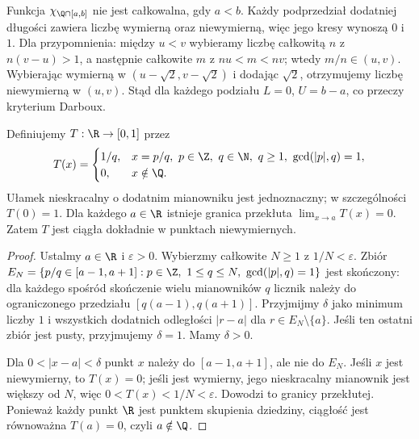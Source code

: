 \begin{przyklad}
\label{ma1:ex:riemann-dirichlet}
Funkcja $\chi_{\Q\cap[a,b]}$ nie jest całkowalna, gdy $a<b$. Każdy podprzedział dodatniej długości zawiera liczbę wymierną oraz niewymierną, więc jego kresy wynoszą $0$ i $1$. Dla przypomnienia: między $u<v$ wybieramy liczbę całkowitą $n$ z $n(v-u)>1$, a następnie całkowite $m$ z $nu<m<nv$; wtedy $m/n\in(u,v)$. Wybierając wymierną w $(u-\sqrt2,v-\sqrt2)$ i dodając $\sqrt2$, otrzymujemy liczbę niewymierną w $(u,v)$. Stąd dla każdego podziału $L=0$, $U=b-a$, co przeczy kryterium Darboux. 
\end{przyklad}

\begin{przyklad}
\label{ma1:ex:thomae}
Definiujemy $T:\R\to[0,1]$ przez
\[
 T(x)=
 \begin{cases}
 1/q,& x=p/q,\ p\in\Z,\ q\in\N,\ q\ge1,\ \gcd(|p|,q)=1,\\
 0,&x\notin\Q.
 \end{cases}
\]
Ułamek nieskracalny o dodatnim mianowniku jest jednoznaczny; w szczególności $T(0)=1$. Dla każdego $a\in\R$ istnieje granica przekłuta $\lim_{x\to a}T(x)=0$. Zatem $T$ jest ciągła dokładnie w punktach niewymiernych.
\end{przyklad}
\begin{proof}
Ustalmy $a\in\R$ i $\varepsilon>0$. Wybierzmy całkowite $N\ge1$ z $1/N<\varepsilon$. Zbiór
$E_N=\{p/q\in[a-1,a+1]:p\in\Z,\ 1\le q\le N,\ \gcd(|p|,q)=1\}$
jest skończony: dla każdego spośród skończenie wielu mianowników $q$ licznik należy do ograniczonego przedziału $[q(a-1),q(a+1)]$. Przyjmijmy $\delta$ jako minimum liczby $1$ i wszystkich dodatnich odległości $|r-a|$ dla $r\in E_N\setminus\{a\}$. Jeśli ten ostatni zbiór jest pusty, przyjmujemy $\delta=1$. Mamy $\delta>0$.

Dla $0<|x-a|<\delta$ punkt $x$ należy do $[a-1,a+1]$, ale nie do $E_N$. Jeśli $x$ jest niewymierny, to $T(x)=0$; jeśli jest wymierny, jego nieskracalny mianownik jest większy od $N$, więc $0<T(x)<1/N<\varepsilon$. Dowodzi to granicy przekłutej. Ponieważ każdy punkt $\R$ jest punktem skupienia dziedziny, ciągłość jest równoważna $T(a)=0$, czyli $a\notin\Q$.
\end{proof}
